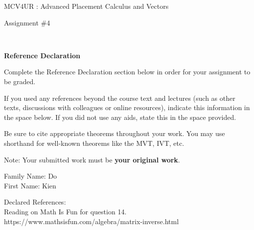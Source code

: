 \documentclass[12pt]{book}
\begin{document}
\vspace{-1.0in}\begin{center}
\Large{MCV4UR : Advanced Placement Calculus and Vectors }

\Large{Assignment \#4}


\end{center}


\vspace{0.015in}\hrulefill\ 

\textbf{Reference Declaration} %

Complete the Reference Declaration section below in order for your assignment to be graded.

If you used any references beyond the course text and lectures (such as other texts, discussions with colleagues or online resources), indicate this information in the space below.  If you did not use any aids, state this in the space provided. 

Be sure to cite appropriate theorems throughout your work. You may use shorthand for well-known theorems like the MVT, IVT, etc. 

Note: Your submitted work must be \textbf{your original work}. 

Family Name: Do \\%
First Name: Kien %

Declared References: \\
Reading on Math Is Fun for question 14. https://www.mathsisfun.com/algebra/matrix-inverse.html


\vspace{0.015in}\hrulefill\ 

\newpage

\end{document}
